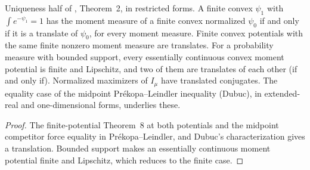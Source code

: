 \begin{lemma}
  \label{lem:cek-finite-potential-uniqueness}
  \leanok
  Uniqueness half of \cite{CorderoKlartag2015}, Theorem~2, in restricted forms. A finite convex $\psi_1$ with
  $\int e^{-\psi_1}=1$ has the moment measure of a finite convex normalized $\psi_0$ if and only if it is a translate of
  $\psi_0$, for every moment measure. Finite convex potentials with the same finite nonzero moment measure are
  translates. For a probability measure with bounded support, every essentially continuous convex moment potential is
  finite and Lipschitz, and two of them are translates of each other (if and only if). Normalized maximizers of $I_\mu$
  have translated conjugates. The equality case of the midpoint Pr\'ekopa--Leindler inequality (Dubuc), in extended-real
  and one-dimensional forms, underlies these.
\end{lemma}
\begin{proof}
  \leanok
  The finite-potential Theorem~8 at both potentials and the midpoint competitor force equality in
  Pr\'ekopa--Leindler, and Dubuc's characterization gives a translation. Bounded support makes an essentially continuous
  moment potential finite and Lipschitz, which reduces to the finite case.
\end{proof}

